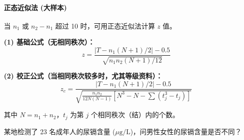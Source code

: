 \documentclass[lang=cn,10pt]{elegantbook}
\begin{document}
\paragraph{正态近似法 (大样本)}
当 $n_1$ 或 $n_2 - n_1$ 超过 10 时，可用正态近似法计算 $z$ 值。

\textbf{(1) 基础公式（无相同秩次）：}
\[
z = \frac{\left|T - n_1(N+1)/2\right| - 0.5}{\sqrt{n_1 n_2 (N+1)/12}}
\]

\textbf{(2) 校正公式（当相同秩次较多时，尤其等级资料）：}
\[
z_c = \frac{\left|T - n_1(N+1)/2\right| - 0.5}{\sqrt{\frac{n_1 n_2}{12N(N-1)} \left[N^3 - N - \sum(t_j^3 - t_j)\right]}}
\]

其中 $N = n_1 + n_2$，$t_j$ 为第 $j$ 个相同秩次（结）内的个数。

\vspace{0.2cm}
\begin{exercise}[数值变量资料的秩和检验]
某地检测了 23 名成年人的尿镉含量 ($\mu\mathrm{g}/\mathrm{L}$)，问男性女性的尿镉含量是否不同？
\end{exercise}
\end{document}
